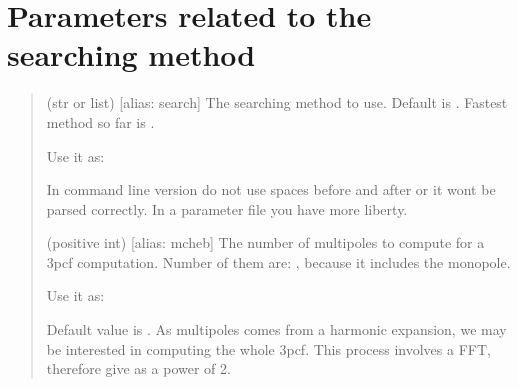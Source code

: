 \documentclass[letterpaper,10pt,english]{sphinxmanual}
\begin{document}
\section{Parameters related to the searching method}
\label{\detokenize{params:parameters-related-to-the-searching-method}}\begin{quote}\begin{description}
\sphinxAtStartPar
(str or list) {[}alias: search{]}
The searching method to use. Default is . Fastest method so far is .

\sphinxAtStartPar
Use it as:

\begin{sphinxVerbatim}[commandchars=\\\{\}]
  
\end{sphinxVerbatim}

\sphinxAtStartPar
In command line version do not use spaces before and after \sphinxcode{\sphinxupquote{=}} or it won\textquotesingle{}t be parsed correctly. In a parameter file you have more liberty.

\sphinxAtStartPar
(positive int) {[}alias: mcheb{]}
The number of multipoles to compute for a 3pcf computation. Number of them are: , because it includes the monopole.

\sphinxAtStartPar
Use it as:

\begin{sphinxVerbatim}[commandchars=\\\{\}]
  
\end{sphinxVerbatim}

\sphinxAtStartPar
Default value is . As multipoles comes from a harmonic expansion, we may be interested in computing the whole 3pcf. This process involves a FFT, therefore give  as a power of 2.

\end{description}\end{quote}
\end{document}
